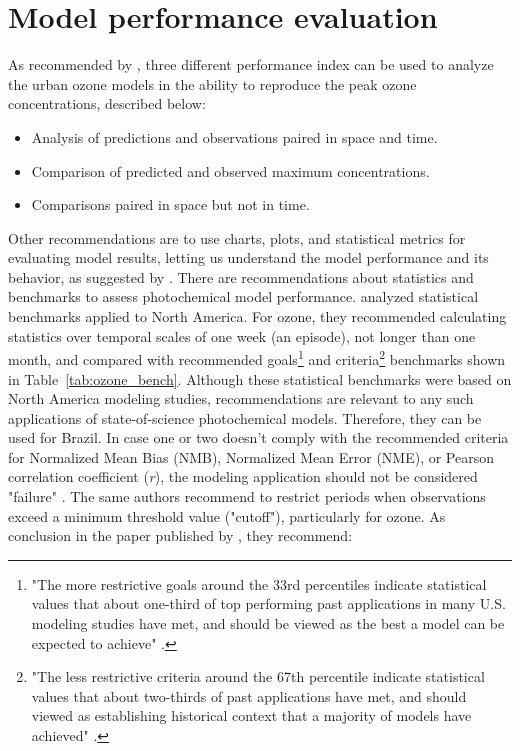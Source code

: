   \section{Model performance evaluation}
  As recommended by \citet{Seinfeld2016}, three different performance index can be used to analyze the urban ozone models in the ability to reproduce the peak ozone concentrations, described below:
  
  \begin{itemize}
  	\item Analysis of predictions and observations paired in space and time.
  	\item Comparison of predicted and observed maximum concentrations.
  	\item Comparisons paired in space but not in time.
  \end{itemize}
  
Other recommendations are to use charts, plots, and statistical metrics for evaluating model results, letting us understand the model performance and its behavior, as suggested by \citet{Emery2017}.
  There are recommendations about statistics and benchmarks to assess photochemical model performance.
  \citet{Emery2017} analyzed statistical benchmarks applied to North America.
  For ozone, they recommended calculating statistics over temporal scales of one week (an episode), not longer than one month, and compared with recommended goals\footnote{"The more restrictive goals around the 33rd percentiles indicate statistical values that about one-third of top performing past applications in many U.S. modeling studies have met, and should be viewed as the best a model can be expected to achieve" \citep[defined in][]{Emery2017}.} and criteria\footnote{"The less restrictive criteria around the 67th percentile indicate statistical values that about two-thirds of past applications have met, and should viewed as establishing historical context that a majority of models have achieved" \citep[defined in][]{Emery2017}.} benchmarks shown in Table~\ref{tab:ozone_bench}.
  Although these statistical benchmarks were based on  North America modeling studies, \citet{Emery2017} recommendations are relevant to any such applications of state-of-science photochemical models.
  Therefore, they can be used for Brazil.
  In case one or two doesn't comply with the recommended criteria for Normalized Mean Bias (NMB), Normalized Mean Error (NME), or Pearson correlation coefficient (\textit{r}), the modeling application should not be considered "failure" \citep{Emery2017}.
  The same authors recommend to restrict periods when observations exceed a minimum threshold value ("cutoff"), particularly for ozone. As conclusion in the paper published by \citet{Emery2017}, they recommend:
  
